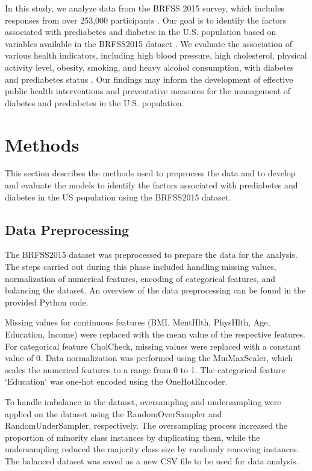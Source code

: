 \documentclass[12pt]{article}
\begin{document}
In this study, we analyze data from the BRFSS 2015 survey, which includes responses from over 253,000 participants \cite{Lu2021Multivariate}. Our goal is to identify the factors associated with prediabetes and diabetes in the U.S. population based on variables available in the BRFSS2015 dataset \cite{Rahman2022Trends}. We evaluate the association of various health indicators, including high blood pressure, high cholesterol, physical activity level, obesity, smoking, and heavy alcohol consumption, with diabetes and prediabetes status \cite{JENSEN1991Risk, BILAL2009DIABETES}. Our findings may inform the development of effective public health interventions and preventative measures for the management of diabetes and prediabetes in the U.S. population.

\section{Methods}

This section describes the methods used to preprocess the data and to develop and evaluate the models to identify the factors associated with prediabetes and diabetes in the US population using the BRFSS2015 dataset.

\subsection{Data Preprocessing}
The BRFSS2015 dataset was preprocessed to prepare the data for the analysis. The steps carried out during this phase included handling missing values, normalization of numerical features, encoding of categorical features, and balancing the dataset. An overview of the data preprocessing can be found in the provided Python code.

Missing values for continuous features (BMI, MentHlth, PhysHlth, Age, Education, Income) were replaced with the mean value of the respective features. For categorical feature CholCheck, missing values were replaced with a constant value of 0. Data normalization was performed using the MinMaxScaler, which scales the numerical features to a range from 0 to 1. The categorical feature `Education` was one-hot encoded using the OneHotEncoder.

To handle imbalance in the dataset, oversampling and undersampling were applied on the dataset using the RandomOverSampler and RandomUnderSampler, respectively. The oversampling process increased the proportion of minority class instances by duplicating them, while the undersampling reduced the majority class size by randomly removing instances. The balanced dataset was saved as a new CSV file to be used for data analysis.
\end{document}
